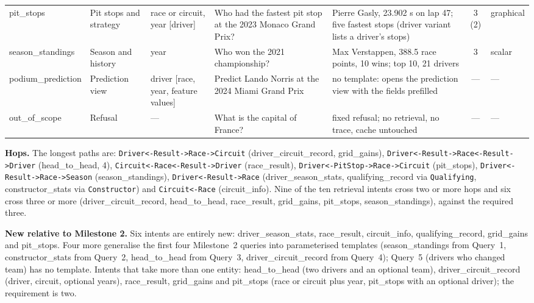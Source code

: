 \documentclass[10pt,a4paper]{article}
\newcommand{\code}[1]{\texttt{#1}}
\begin{document}
\begin{table}[t!]
\begin{tabular}{@{}R{1.9cm}R{1.5cm}R{1.6cm}R{3.6cm}R{4.6cm}cR{1.0cm}@{}}
pit\_\allowbreak{}stops & Pit stops and strategy & race or circuit, year [driver] & Who had the fastest pit stop at the 2023 Monaco Grand Prix? & Pierre Gasly, 23.902 s on lap 47; five fastest stops (driver variant lists a driver's stops) & 3 (2) & graphical \\
season\_\allowbreak{}standings & Season and history & year & Who won the 2021 championship? & Max Verstappen, 388.5 race points, 10 wins; top 10, 21 drivers & 3 & scalar \\
podium\_\allowbreak{}prediction & Prediction view & driver [race, year, feature values] & Predict Lando Norris at the 2024 Miami Grand Prix & no template: opens the prediction view with the fields prefilled & --- & --- \\
out\_\allowbreak{}of\_\allowbreak{}scope & Refusal & --- & What is the capital of France? & fixed refusal; no retrieval, no trace, cache untouched & --- & --- \\
\bottomrule
\end{tabular}
\end{table}

{\sloppy \textbf{Hops.} The longest paths are: \code{Driver<-\allowbreak{}Result->\allowbreak{}Race->\allowbreak{}Circuit} (driver\_circuit\_record, grid\_gains), \code{Driver<-\allowbreak{}Result->\allowbreak{}Race<-\allowbreak{}Result->\allowbreak{}Driver} (head\_to\_head, 4), \code{Circuit<-\allowbreak{}Race<-\allowbreak{}Result->\allowbreak{}Driver} (race\_result), \code{Driver<-\allowbreak{}PitStop->\allowbreak{}Race->\allowbreak{}Circuit} (pit\_stops), \code{Driver<-\allowbreak{}Result->\allowbreak{}Race->\allowbreak{}Season} (season\_standings), \code{Driver<-\allowbreak{}Result->\allowbreak{}Race} (driver\_season\_stats, qualifying\_record via \code{Qualifying}, constructor\_stats via \code{Constructor}) and \code{Circuit<-\allowbreak{}Race} (circuit\_info). Nine of the ten retrieval intents cross two or more hops and six cross three or more (driver\_circuit\_record, head\_to\_head, race\_result, grid\_gains, pit\_stops, season\_standings), against the required three.}

\textbf{New relative to Milestone 2.} Six intents are entirely new: driver\_season\_stats, race\_result, circuit\_info, qualifying\_record, grid\_gains and pit\_stops. Four more generalise the first four Milestone~2 queries into parameterised templates (season\_standings from Query~1, constructor\_stats from Query~2, head\_to\_head from Query~3, driver\_circuit\_record from Query~4); Query~5 (drivers who changed team) has no template. Intents that take more than one entity: head\_to\_head (two drivers and an optional team), driver\_circuit\_record (driver, circuit, optional years), race\_result, grid\_gains and pit\_stops (race or circuit plus year, pit\_stops with an optional driver); the requirement is two.
\end{document}

